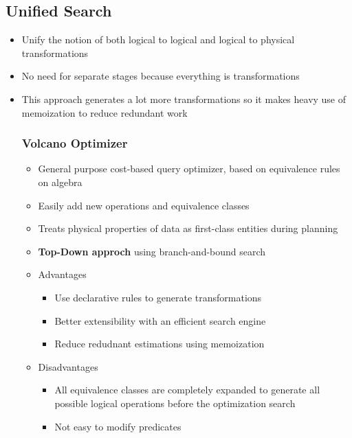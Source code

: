 \documentclass[11pt]{article}
\begin{document}
    \subsection*{Unified Search}
    \begin{itemize}
        \item Unify the notion of both logical to logical and logical to physical transformations
        \item No need for separate stages because everything is transformations
        \item This approach generates a lot more transformations so it makes heavy use of memoization to reduce redundant work

        \subsubsection*{Volcano Optimizer~\cite{p209-graefe}}
        \begin{itemize}
            \item General purpose cost-based query optimizer, based on equivalence rules on algebra
            \item Easily add new operations and equivalence classes
            \item Treats physical properties of data as first-class entities during planning
            \item \textbf{Top-Down approch} using branch-and-bound search

            \item Advantages
            \begin{itemize}
                \item Use declarative rules to generate transformations
                \item Better extensibility with an efficient search engine
                \item Reduce redudnant estimations using memoization
            \end{itemize}

            \item Disadvantages
            \begin{itemize}
                \item All equivalence classes are completely expanded to generate all possible logical operations before the optimization search
                \item Not easy to modify predicates
            \end{itemize}
        \end{itemize}


\end{itemize}
\end{document}
